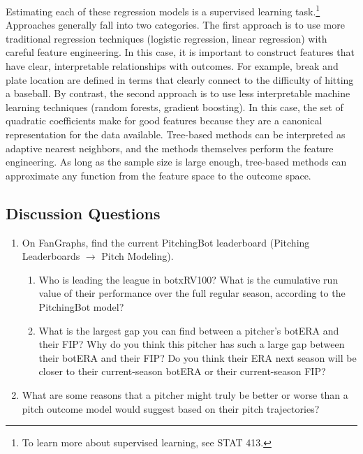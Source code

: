 \documentclass{article}
\begin{document}
    Estimating each of these regression models is a supervised learning task.\footnote{To learn more about supervised learning, see STAT 413.} Approaches generally fall into two categories. The first approach is to use more traditional regression techniques (logistic regression, linear regression) with careful feature engineering. In this case, it is important to construct features that have clear, interpretable relationships with outcomes. For example, break and plate location are defined in terms that clearly connect to the difficulty of hitting a baseball. By contrast, the second approach is to use less interpretable machine learning techniques (random forests, gradient boosting). In this case, the set of quadratic coefficients make for good features because they are a canonical representation for the data available. Tree-based methods can be interpreted as adaptive nearest neighbors, and the methods themselves perform the feature engineering. As long as the sample size is large enough, tree-based methods can approximate any function from the feature space to the outcome space.

  \subsection{\sc Discussion Questions}

    \begin{enumerate}
      \item On FanGraphs, find the current PitchingBot leaderboard (Pitching Leaderboards $\rightarrow$ Pitch Modeling).
      \begin{enumerate}
        \item Who is leading the league in botxRV100? What is the cumulative run value of their performance over the full regular season, according to the PitchingBot model?
        \item What is the largest gap you can find between a pitcher's botERA and their FIP? Why do you think this pitcher has such a large gap between their botERA and their FIP? Do you think their ERA next season will be closer to their current-season botERA or their current-season FIP?
      \end{enumerate}
      \item What are some reasons that a pitcher might truly be better or worse than a pitch outcome model would suggest based on their pitch trajectories?
    \end{enumerate}
\end{document}
